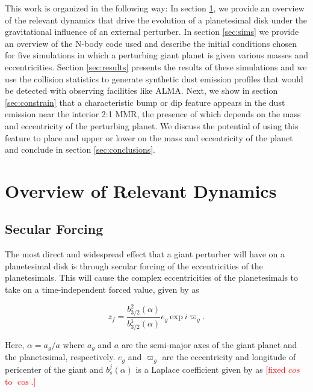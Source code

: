 \documentclass[twocolumn]{aastex63}
\newcommand{\ACBc}[1]{\textcolor{red}{#1}}
\begin{document}
This work is organized in the following way: In section \ref{sec:dynamics}, we provide an overview of the relevant dynamics that drive the evolution 
of a planetesimal disk under the gravitational influence of an external perturber. In section \ref{sec:sims} we provide an overview of the N-body code 
used and describe the initial conditions chosen for five simulations in which a perturbing giant planet is given various masses 
and eccentricities. Section \ref{sec:results} presents the results of these simulations and we use the collision statistics to generate synthetic dust 
emission profiles that would be detected with observing facilities like ALMA. Next, we show in section \ref{sec:constrain} that a characteristic bump 
or dip feature appears in the dust emission near the interior 2:1 MMR, the presence of which depends on the mass and eccentricity of the perturbing 
planet. We discuss the potential of using this feature to place and upper or lower on the mass and eccentricity of the planet and conclude in section 
\ref{sec:conclusions}.

\section{Overview of Relevant Dynamics} \label{sec:dynamics}

\subsection{Secular Forcing}\label{sec:sec_force}

The most direct and widespread effect that a giant perturber will have on a planetesimal disk is through secular forcing of the 
eccentricities of the planetesimals. This will cause the complex eccentricities of the planetesimals to take on a time-independent 
forced value, given by \citep{1999ApJ...527..918W} as

\begin{equation}\label{eq:eforced}
	z_{f} = \frac{b^{2}_{3/2} (\alpha)}{b^{1}_{3/2} (\alpha)} e_{g} ~ \mathrm{exp} ~ i \varpi_{g}.
\end{equation}

\noindent Here, $\alpha = a_{g} / a$ where $a_{g}$ and $a$ are the semi-major axes of the giant planet and the planetesimal, 
respectively. $e_{g}$ and $\varpi_{g}$ are the eccentricity and longitude of pericenter of the giant and $b^{j}_{s} (\alpha)$ is a 
Laplace coefficient given by \citep{2000ssd..book.....M} as \ACBc{[fixed $cos$ to $\cos$.]}
\end{document}
